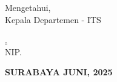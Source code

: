 \begin{center}
  Mengetahui, \\
  Kepala Departemen \namaDepartemen \namaFakultas - ITS\\

  \vspace{8ex}

  \underline{\namaKaDep.} \\
  NIP. \nipKaDep
\end{center}

\begin{center}
  \textbf{\MakeUppercase{Surabaya Juni, 2025}}
\end{center}
\endgroup
